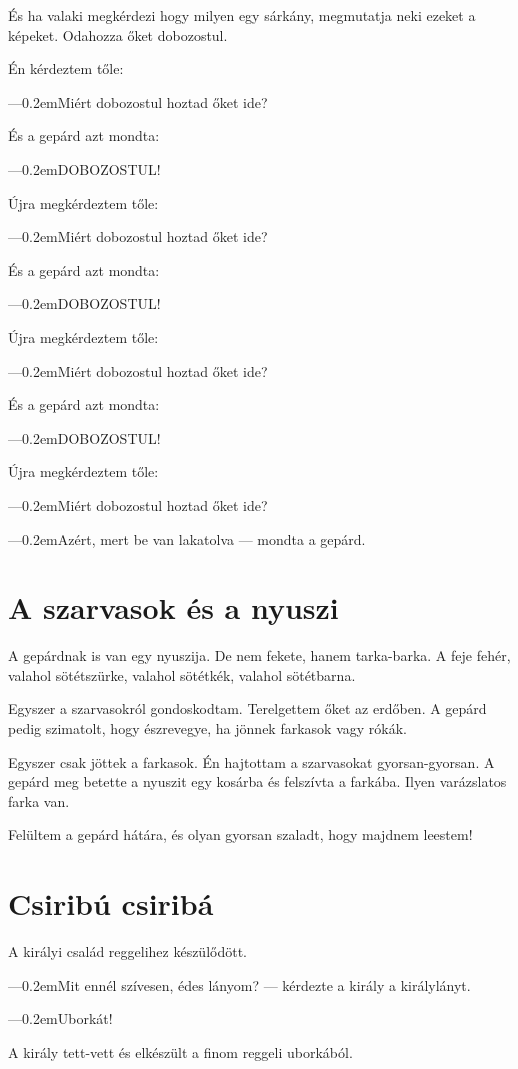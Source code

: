 \documentclass[12pt]{memoir}
\def\dash{---\kern 0.2em}
\begin{document}
És ha valaki megkérdezi hogy milyen egy sárkány, megmutatja neki ezeket a
képeket. Odahozza őket dobozostul.

Én kérdeztem tőle:

\dash Miért dobozostul hoztad őket ide?

És a gepárd azt mondta:

\dash DOBOZOSTUL!

Újra megkérdeztem tőle:

\dash Miért dobozostul hoztad őket ide?

És a gepárd azt mondta:

\dash DOBOZOSTUL!

Újra megkérdeztem tőle:

\dash Miért dobozostul hoztad őket ide?

És a gepárd azt mondta:

\dash DOBOZOSTUL!

Újra megkérdeztem tőle:

\dash Miért dobozostul hoztad őket ide?

\dash Azért, mert be van lakatolva — mondta a gepárd.
\cleartoverso


\section{A szarvasok és a nyuszi}
A gepárdnak is van egy nyuszija. De nem fekete, hanem tarka-barka. A feje
fehér, valahol sötétszürke, valahol sötétkék, valahol sötétbarna.

Egyszer a szarvasokról gondoskodtam. Terelgettem őket az erdőben. A gepárd
pedig szimatolt, hogy észrevegye, ha jönnek farkasok vagy rókák.

Egyszer csak jöttek a farkasok. Én hajtottam a szarvasokat gyorsan-gyorsan. A
gepárd meg betette a nyuszit egy kosárba és felszívta a farkába. Ilyen
varázslatos farka van.

Felültem a gepárd hátára, és olyan gyorsan szaladt, hogy majdnem leestem!
\cleartoverso


\section{Csiribú csiribá}
A királyi család reggelihez készülődött.

\dash Mit ennél szívesen, édes lányom? — kérdezte a király a királylányt.

\dash Uborkát!

A király tett-vett és elkészült a finom reggeli uborkából.
\end{document}
